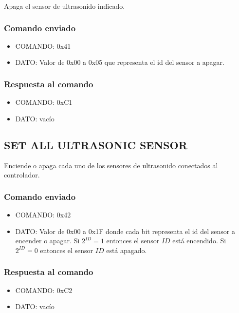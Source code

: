 \documentclass[a4paper,10pt]{article}
\begin{document}
Apaga el sensor de ultrasonido indicado.

\subsubsection*{Comando enviado}

\begin{itemize}
	\item{COMANDO:} 0x41
	\item{DATO:} Valor de 0x00 a 0x05 que representa el id del sensor a apagar.
\end{itemize}

\subsubsection*{Respuesta al comando}

\begin{itemize}
	\item{COMANDO:} 0xC1
	\item{DATO:} vac\'io
\end{itemize}

\subsection{SET ALL ULTRASONIC SENSOR}
\label{set_all_ultrasonic_sensor}

Enciende o apaga cada uno de los sensores de ultrasonido conectados al controlador.

\subsubsection*{Comando enviado}

\begin{itemize}
	\item{COMANDO:} 0x42
	\item{DATO:} Valor de 0x00 a 0x1F donde cada bit representa el id del sensor a encender o apagar.
	Si $2^{ID} = 1$ entonces el sensor $ID$ est\'a encendido.
	Si $2^{ID} = 0$ entonces el sensor $ID$ est\'a apagado.
\end{itemize}

\subsubsection*{Respuesta al comando}

\begin{itemize}
	\item{COMANDO:} 0xC2
	\item{DATO:} vac\'io
\end{itemize}
\end{document}
